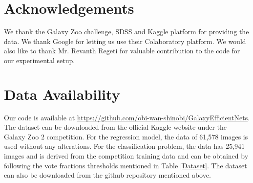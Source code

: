 \documentclass[fleqn,usenatbib]{mnras}
\begin{document}
\section{Acknowledgements}
\hspace*{0.25 in}We thank the Galaxy Zoo challenge, SDSS and Kaggle platform for providing the data. We thank Google for letting us use their Colaboratory platform. We would also like to thank Mr. Revanth Regeti for valuable contribution to the code for our experimental setup.

\section{Data Availability}
Our code is available at \href{https://github.com/obi-wan-shinobi/GalaxyEfficientNets}{https://github.com/obi-wan-shinobi/GalaxyEfficientNets}. The dataset can be downloaded from the official Kaggle website under the Galaxy Zoo 2 competition. For the regression model, the data of 61,578 images is used without any alterations. For the classification problem, the data has 25,941 images and is derived from the competition training data and can be obtained by following the vote fractions thresholds mentioned in Table \ref{Dataset}. The dataset can also be downloaded from the github repository mentioned above.











\bsp	%
\label{lastpage}
\end{document}
